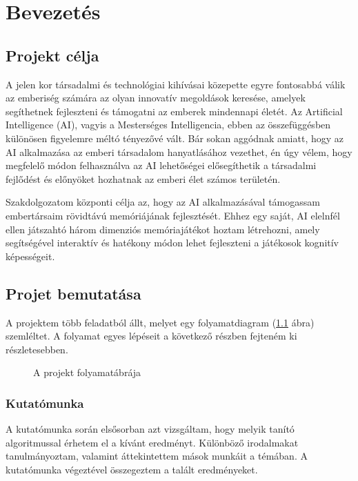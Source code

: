 \chapter{Bevezetés}
\usetikzlibrary{shapes,arrows}

\thispagestyle{fancy}
\pagestyle{fancy}
\section{Projekt célja}
A jelen kor társadalmi és technológiai kihívásai közepette egyre fontosabbá válik az emberiség számára az olyan innovatív megoldások keresése, amelyek segíthetnek fejleszteni és támogatni az emberek mindennapi életét. Az Artificial Intelligence (AI), vagyis a Mesterséges Intelligencia, ebben az összefüggésben különösen figyelemre méltó tényezővé vált. Bár sokan aggódnak amiatt, hogy az AI alkalmazása az emberi társadalom hanyatlásához vezethet, én úgy vélem, hogy  megfelelő módon felhasználva az AI lehetőségei elősegíthetik a társadalmi fejlődést és előnyöket hozhatnak az emberi élet számos területén.

Szakdolgozatom központi célja az, hogy az AI alkalmazásával támogassam embertársaim rövidtávú memóriájának fejlesztését. Ehhez egy saját, AI elelnfél ellen játszahtó három dimenziós memóriajátékot hoztam létrehozni, amely segítségével interaktív és hatékony módon lehet fejleszteni a játékosok kognitív képességeit. 
\section{Projet bemutatása}

A projektem több feladatból állt, melyet egy folyamatdiagram (\ref{fig:folyamat_diagram} ábra) szemléltet. A folyamat egyes lépéseit a következő részben fejteném ki részletesebben.
\begin{figure}[H]
    \centering
    
    \caption{A projekt folyamatábrája}
    \label{fig:folyamat_diagram}
\end{figure}

\subsection{Kutatómunka}
A kutatómunka során elsősorban azt vizsgáltam, hogy melyik tanító algoritmussal érhetem el a kívánt eredményt. Különböző irodalmakat tanulmányoztam, valamint áttekintettem mások munkáit a témában. A kutatómunka végeztével összegeztem a talált eredményeket.

